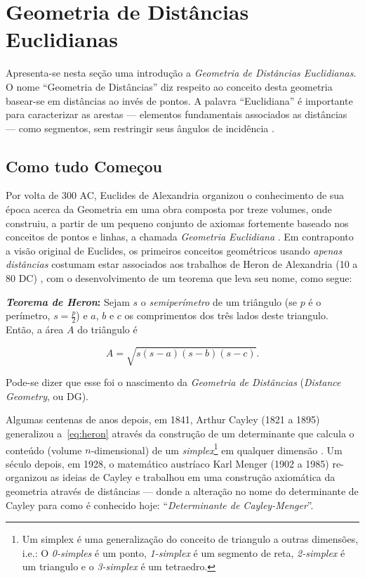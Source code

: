 \section{Geometria de Distâncias Euclidianas}
Apresenta-se nesta seção uma introdução a \textit{Geometria de Distâncias Euclidianas}. O nome ``Geometria de Distâncias'' diz respeito ao conceito desta geometria basear-se em distâncias ao invés de pontos. A palavra ``Euclidiana'' é importante para caracterizar as arestas --- elementos fundamentais associados as distâncias --- como segmentos, sem restringir seus ângulos de incidência \cite{libertiEDG}.

\subsection{Como tudo Começou}

Por volta de 300 AC, Euclides de Alexandria organizou o conhecimento de sua época acerca da Geometria em uma obra composta por treze volumes, onde construiu, a partir de um pequeno conjunto de axiomas fortemente baseado nos conceitos de pontos e linhas, a chamada \textit{Geometria Euclidiana} \cite{elementosEuclides}. Em contraponto a visão original de Euclides, os primeiros conceitos geométricos usando \textit{apenas distâncias} costumam estar associados aos trabalhos de Heron de Alexandria (10 a 80 DC) \cite{libertiEDG}, com o desenvolvimento de um teorema que leva seu nome, como segue: 
\begin{center}
	\begin{minipage}{0.9 \linewidth}
		\textbf{\textit{Teorema de Heron}:} Sejam $s$ o \textit{semiperímetro} de um triângulo (se $p$ é o perímetro, $s = \frac{p}{2}$) e $a$, $b$ e $c$ os comprimentos dos três lados deste triangulo. Então, a área $A$ do triângulo é
		
		\begin{equation}\tag{Fórmula de Heron}
		A = \sqrt{s(s-a)(s-b)(s-c)}.
		\label{eq:heron}
		\end{equation}
	\end{minipage}
\end{center} 
Pode-se dizer que esse foi o nascimento da \textit{Geometria de Distâncias} (\textit{Distance Geometry}, ou DG).

Algumas centenas de anos depois, em 1841, Arthur Cayley (1821 a 1895) generalizou a~\ref{eq:heron} através da construção de um determinante que calcula o conteúdo (volume $n$-dimensional) de um \textit{simplex}\footnote{Um simplex é uma generalização do conceito de triangulo a outras dimensões, i.e.: O \textit{0-simples} é um ponto, \textit{1-simplex} é um segmento de reta, \textit{2-simplex} é um triangulo e o \textit{3-simplex} é um tetraedro.} em qualquer dimensão \cite{cayley1841HaronGD}. Um século depois, em 1928, o matemático austríaco Karl Menger (1902 a 1985) re-organizou as ideias de Cayley e trabalhou em uma construção axiomática da geometria através de distâncias \cite{mengerDeterminante} --- donde a alteração no nome do determinante de Cayley para como é conhecido hoje: ``\textit{Determinante de Cayley-Menger}''.  

